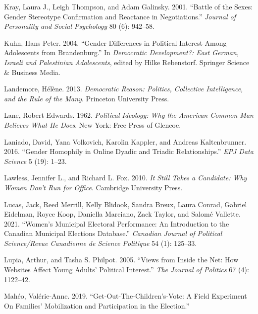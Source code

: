 \documentclass[
  letterpaper,
  DIV=11,
  numbers=noendperiod]{scrreprt}
\newlength{\cslhangindent}
\newlength{\cslentryspacingunit} %
\newenvironment{CSLReferences}[2] %
 {%
  \setlength{\parindent}{0pt}
  \ifodd #1
  \let\oldpar\par
  \def\par{\hangindent=\cslhangindent\oldpar}
  \fi
  \setlength{\parskip}{#2\cslentryspacingunit}
 }%
 {}
\begin{document}
\begin{CSLReferences}{1}{0}
\leavevmode{}%
Kray, Laura J., Leigh Thompson, and Adam Galinsky. 2001. {``{Battle of
the Sexes: Gender Stereotype Confirmation and Reactance in
Negotiations}.''} \emph{Journal of Personality and Social Psychology} 80
(6): 942--58.

\leavevmode{}%
Kuhn, Hans Peter. 2004. {``{Gender Differences in Political Interest
Among Adolescents from Brandenburg}.''} In \emph{{Democratic
Development?: East German, Israeli and Palestinian Adolescents}}, edited
by Hilke Rebenstorf. Springer Science \& Business Media.

\leavevmode{}%
Landemore, Hélène. 2013. \emph{{Democratic Reason: Politics, Collective
Intelligence, and the Rule of the Many}}. Princeton University Press.

\leavevmode{}%
Lane, Robert Edwards. 1962. \emph{{Political Ideology: Why the American
Common Man Believes What He Does}}. New York: Free Press of Glencoe.

\leavevmode{}%
Laniado, David, Yana Volkovich, Karolin Kappler, and Andreas
Kaltenbrunner. 2016. {``{Gender Homophily in Online Dyadic and Triadic
Relationships}.''} \emph{EPJ Data Science} 5 (19): 1--23.

\leavevmode{}%
Lawless, Jennifer L., and Richard L. Fox. 2010. \emph{{It Still Takes a
Candidate: Why Women Don't Run for Office}}. Cambridge University Press.

\leavevmode{}%
Lucas, Jack, Reed Merrill, Kelly Blidook, Sandra Breux, Laura Conrad,
Gabriel Eidelman, Royce Koop, Daniella Marciano, Zack Taylor, and Salomé
Vallette. 2021. {``{Women's Municipal Electoral Performance: An
Introduction to the Canadian Municipal Elections Database}.''}
\emph{Canadian Journal of Political Science/Revue Canadienne de Science
Politique} 54 (1): 125--33.

\leavevmode{}%
Lupia, Arthur, and Tasha S. Philpot. 2005. {``{Views from Inside the
Net: How Websites Affect Young Adults' Political Interest}.''} \emph{The
Journal of Politics} 67 (4): 1122--42.

\leavevmode{}%
Mahéo, Valérie-Anne. 2019. {``{Get-Out-The-Children's-Vote: A Field
Experiment On Families' Mobilization and Participation in the
Election}.''}


\end{CSLReferences}
\end{document}
